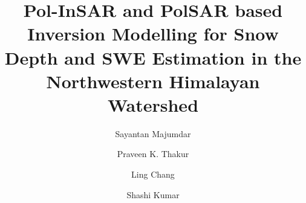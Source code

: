 \documentclass[review]{elsarticle}
\numberwithin{equation}{section}
\numberwithin{figure}{section}
\numberwithin{table}{section}
\begin{document}
\begin{frontmatter}

\title{Pol-InSAR and PolSAR based Inversion Modelling for Snow Depth and SWE Estimation in the Northwestern Himalayan Watershed}


\author[itc,iirs]{Sayantan Majumdar }

\author[iirs]{Praveen K. Thakur}
\author[itc]{Ling Chang}
\author[iirs]{Shashi Kumar}

\address[itc]{Faculty of Geo-information Science and Earth Observation (ITC), University of Twente}
\address[iirs]{Indian Institute of Remote Sensing (IIRS), ISRO}


\end{frontmatter}
\end{document}
